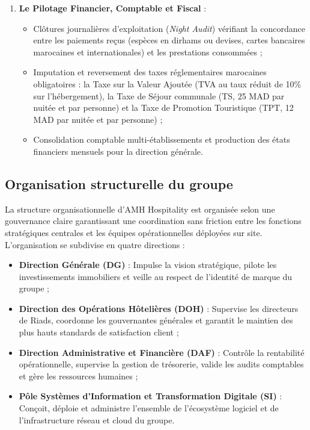 \documentclass[12pt,a4paper,oneside]{report}
\begin{document}
\begin{enumerate}
    \item \textbf{Le Pilotage Financier, Comptable et Fiscal} :
    \begin{itemize}
        \item Clôtures journalières d'exploitation (\textit{Night Audit}) vérifiant la concordance entre les paiements reçus (espèces en dirhams ou devises, cartes bancaires marocaines et internationales) et les prestations consommées ;
        \item Imputation et reversement des taxes réglementaires marocaines obligatoires : la Taxe sur la Valeur Ajoutée (TVA au taux réduit de 10\% sur l'hébergement), la Taxe de Séjour communale (TS, 25 MAD par nuitée et par personne) et la Taxe de Promotion Touristique (TPT, 12 MAD par nuitée et par personne) ;
        \item Consolidation comptable multi-établissements et production des états financiers mensuels pour la direction générale.
    \end{itemize}
\end{enumerate}

\subsection{Organisation structurelle du groupe}

La structure organisationnelle d'AMH Hospitality est organisée selon une gouvernance claire garantissant une coordination sans friction entre les fonctions stratégiques centrales et les équipes opérationnelles déployées sur site. L'organisation se subdivise en quatre directions :

\begin{itemize}
    \item \textbf{Direction Générale (DG)} : Impulse la vision stratégique, pilote les investissements immobiliers et veille au respect de l'identité de marque du groupe ;
    \item \textbf{Direction des Opérations Hôtelières (DOH)} : Supervise les directeurs de Riads, coordonne les gouvernantes générales et garantit le maintien des plus hauts standards de satisfaction client ;
    \item \textbf{Direction Administrative et Financière (DAF)} : Contrôle la rentabilité opérationnelle, supervise la gestion de trésorerie, valide les audits comptables et gère les ressources humaines ;
    \item \textbf{Pôle Systèmes d'Information et Transformation Digitale (SI)} : Conçoit, déploie et administre l'ensemble de l'écosystème logiciel et de l'infrastructure réseau et cloud du groupe.
\end{itemize}
\end{document}
